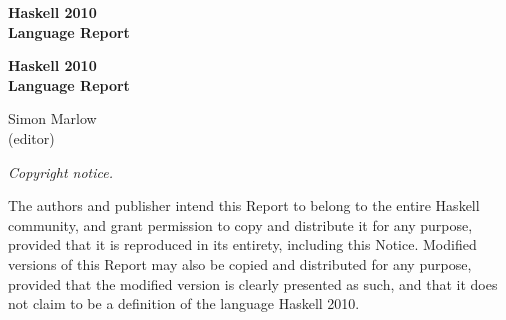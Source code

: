 \documentclass[twoside,10pt]{book}
\newcommand{\ifhtml}[2]{%
\ifx \HCode\Undef
#2
\else
#1
\fi
}
\renewcommand{\floatpagefraction}{0.1}
\renewcommand{\textfraction}{0.1}
\newcommand{\outline}[1]{%
\begin{lrbox}{\fmbox}%
\begin{minipage}{415pt}%
\vspace{1 ex}
#1  
\end{minipage}%
\vspace{1 ex}%
\end{lrbox}%
\begin{center}%
\fbox{\usebox{\fmbox}}%
\end{center}
}
\begin{document}


\setcounter{topnumber}{2}
\setcounter{bottomnumber}{0}
\setcounter{totalnumber}{2}
\setcounter{dbltopnumber}{2}
\renewcommand{\textfraction}{0.1}
\renewcommand{\floatpagefraction}{0.9}
\renewcommand{\dblfloatpagefraction}{0.9}

\setcounter{page}{0}


\begin{titlepage}

\setcounter{page}{0}

\ifhtml{%
\begin{center}
{\LARGE\bf Haskell 2010} \\[.1in]
{\LARGE\bf Language Report} \\[.3in]
\end{center}
}{%
\outline{
\vspace{.3in}
\begin{center}
{\LARGE\bf Haskell 2010} \\[.1in]
{\LARGE\bf Language Report} \\[.3in]
\end{center}
\vspace{.3in}
}
}

\vspace{.15in}
\begin{center} \large
Simon Marlow\\
(editor)
\end{center}
\vspace{.15in}

\vspace{3in}

\begin{center} \emph{Copyright notice.} \end{center}

The authors and publisher intend this Report to belong to the entire Haskell
community, and grant permission to copy and distribute it for any
purpose, provided that it is reproduced in its
entirety, including this Notice. Modified versions of this Report may
also be copied and distributed for any 
purpose,
provided that the modified version is clearly presented as such, and
that it does not claim to be a definition of the language Haskell 2010.
\end{titlepage}
\end{document}

